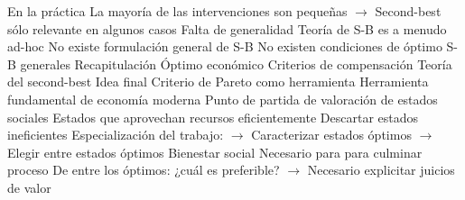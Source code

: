 \documentclass{nuevotema}
\begin{document}
\begin{esquemal}
				\4 En la práctica
				\4[] La mayoría de las intervenciones son pequeñas
				\4[] $\to$ Second-best sólo relevante en algunos casos
			\3 Falta de generalidad
				\4 Teoría de S-B es a menudo ad-hoc
				\4 No existe formulación general de S-B
				\4 No existen condiciones de óptimo S-B generales
	\1[] 
		\2 Recapitulación
			\3 Óptimo económico
			\3 Criterios de compensación
			\3 Teoría del second-best
		\2 Idea final
			\3 Criterio de Pareto como herramienta
				\4 Herramienta fundamental de economía moderna
				\4 Punto de partida de valoración de estados sociales
				\4[] Estados que aprovechan recursos eficientemente
				\4[] Descartar estados ineficientes
				\4 Especialización del trabajo:
				\4[] $\to$ Caracterizar estados óptimos
				\4[] $\to$ Elegir entre estados óptimos
			\3 Bienestar social
				\4 Necesario para para culminar proceso
				\4 De entre los óptimos:
				\4[] ¿cuál es preferible?
				\4[] $\to$ Necesario explicitar juicios de valor
\end{esquemal}

\graficas
\end{document}
